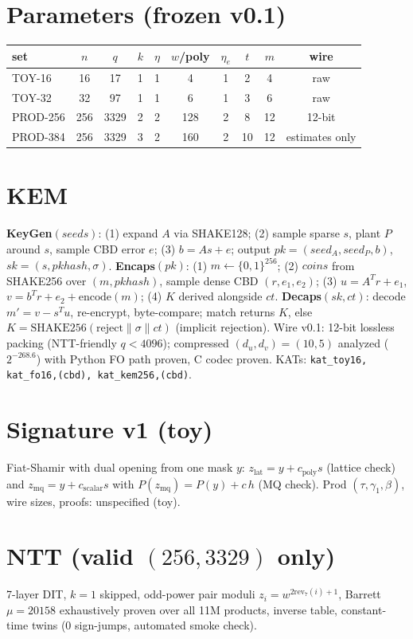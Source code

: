 \documentclass[11pt,a4paper]{article}
\begin{document}
\section{Parameters (frozen v0.1)}
\begin{center}
\begin{tabular}{lccccccccc}
\toprule
set & $n$ & $q$ & $k$ & $\eta$ & $w$/poly & $\eta_e$ & $t$ & $m$ & wire \\
\midrule
TOY-16 & 16 & 17 & 1 & 1 & 4 & 1 & 2 & 4 & raw \\
TOY-32 & 32 & 97 & 1 & 1 & 6 & 1 & 3 & 6 & raw \\
PROD-256 & 256 & 3329 & 2 & 2 & 128 & 2 & 8 & 12 & 12-bit \\
PROD-384 & 256 & 3329 & 3 & 2 & 160 & 2 & 10 & 12 & estimates only \\
\bottomrule
\end{tabular}
\end{center}

\section{KEM}
\textbf{KeyGen}$(seeds)$: (1) expand $A$ via SHAKE128;
(2) sample sparse $s$, plant $P$ around $s$, sample CBD error $e$;
(3) $b = As+e$; output $pk=(seed_A,seed_P,b)$,
$sk=(s,pkhash,\sigma)$.
\textbf{Encaps}$(pk)$: (1) $m \gets \{0,1\}^{256}$;
(2) $coins$ from SHAKE256 over $(m,pkhash)$, sample dense CBD
$(r,e_1,e_2)$; (3) $u=A^Tr+e_1$, $v=b^Tr+e_2+\mathrm{encode}(m)$;
(4) $K$ derived alongside $ct$.
\textbf{Decaps}$(sk,ct)$: decode $m'=v-s^Tu$, re-encrypt, byte-compare;
match returns $K$, else $K=\mathrm{SHAKE256}(\text{reject}\|\sigma\|ct)$
(implicit rejection).
Wire v0.1: 12-bit lossless packing (NTT-friendly $q<4096$); compressed
$(d_u,d_v)=(10,5)$ analyzed ($2^{-268.6}$) with Python FO path proven, C
codec proven. KATs: \texttt{kat\_toy16, kat\_fo16{,(cbd)}, kat\_kem256{,(cbd)}}.

\section{Signature v1 (toy)}
Fiat-Shamir with dual opening from one mask $y$: $z_{\mathrm{lat}} =
y+c_{\mathrm{poly}}s$ (lattice check) and $z_{\mathrm{mq}} =
y+c_{\mathrm{scalar}}s$ with $P(z_{\mathrm{mq}})=P(y)+c\,h$ (MQ check).
Prod $(\tau,\gamma_1,\beta)$, wire sizes, proofs: unspecified (toy).

\section{NTT (valid $(256,3329)$ only)}
7-layer DIT, $k{=}1$ skipped, odd-power pair moduli $z_i=w^{2\mathrm{rev}_7(i)+1}$,
Barrett $\mu{=}20158$ exhaustively proven over all 11M products, inverse
table, constant-time twins (0 sign-jumps, automated smoke check).
\end{document}

